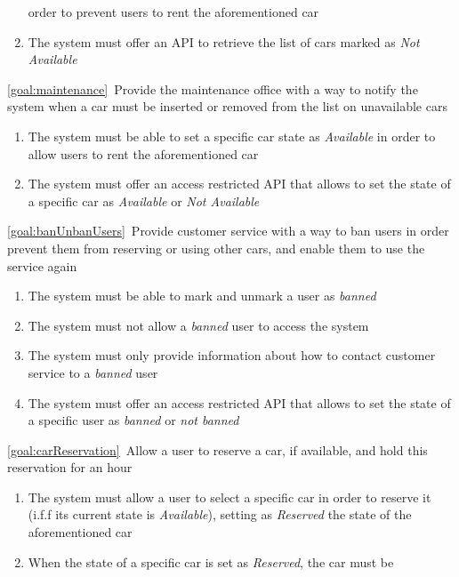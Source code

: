 \begin{description}
\begin{enumerate}[resume*]
   				order to prevent users to rent the aforementioned car
   				\item The system must offer an API  to retrieve the list of cars marked as \emph{Not Available}
  			\end{enumerate}
		\item \ref{goal:maintenance}\ Provide the maintenance office with a way to notify the
		system when a car must be inserted or removed from the list on unavailable cars
			\begin{enumerate}[resume*]
   				\item The system must be able to set a specific car state as \emph{Available} in order 
   				to allow users to rent the aforementioned car
   				\item The system must offer an access restricted API  that allows
   				to set the state of a specific car as \emph{Available} or \emph{Not Available}
  			\end{enumerate}
  		\item \ref{goal:banUnbanUsers}\ Provide customer service with a way to ban users in order
  		prevent them from reserving or using other cars, and enable them to use the service again
  			\begin{enumerate}[resume*]
  				\item The system must be able to mark and unmark a user as \emph{banned}
  				\item The system must not allow a \emph{banned} user to access the system
   				\item The system must only provide information about how to contact customer
   				service to a \emph{banned} user
   				\item The system must offer an access restricted API that allows to set the state of a
   				specific user as \emph{banned} or \emph{not banned}
   			\end{enumerate}
 	  	\item \ref{goal:carReservation}\ Allow a user to reserve a car, if available, and hold this
 	  	reservation for an hour
 	  		\begin{enumerate}[resume*]
 	  			\item The system must allow a user to select a specific car in order to reserve it 
 	  			(i.f.f its current state is \emph{Available}), setting as \emph{Reserved} the state of
 	  			the aforementioned car
 	  			\item When the state of a specific car is set as \emph{Reserved}, the car must be

\end{enumerate}
\end{description}

